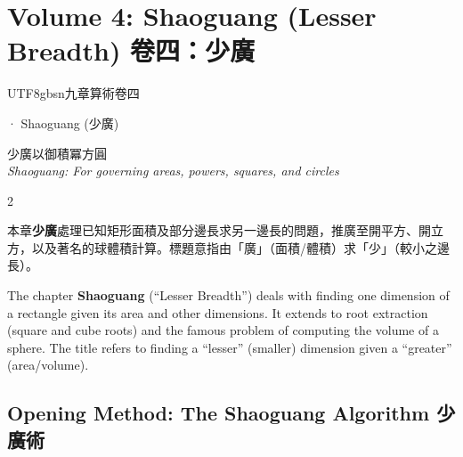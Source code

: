 \documentclass[10pt,a4paper]{article}
\begin{document}
\section{Volume 4: Shaoguang (Lesser Breadth) 卷四：少廣}

\begin{volumeheader}{\begin{CJK}{UTF8}{gbsn}九章算術卷四\end{CJK} · Shaoguang (少廣)}
少廣以御積冪方圓\\[0.2em]
\small\textit{Shaoguang: For governing areas, powers, squares, and circles}
\end{volumeheader}

\vspace{0.3cm}

\begin{paracol}{2}
\begin{leftcolumn*}
本章\textbf{少廣}處理已知矩形面積及部分邊長求另一邊長的問題，推廣至開平方、開立方，以及著名的球體積計算。標題意指由「廣」（面積/體積）求「少」（較小之邊長）。
\end{leftcolumn*}
\begin{rightcolumn*}
The chapter \textbf{Shaoguang} (``Lesser Breadth'') deals with finding one dimension of a rectangle given its area and other dimensions. It extends to root extraction (square and cube roots) and the famous problem of computing the volume of a sphere. The title refers to finding a ``lesser'' (smaller) dimension given a ``greater'' (area/volume).
\end{rightcolumn*}
\end{paracol}

\subsection{Opening Method: The Shaoguang Algorithm 少廣術}
\end{document}
